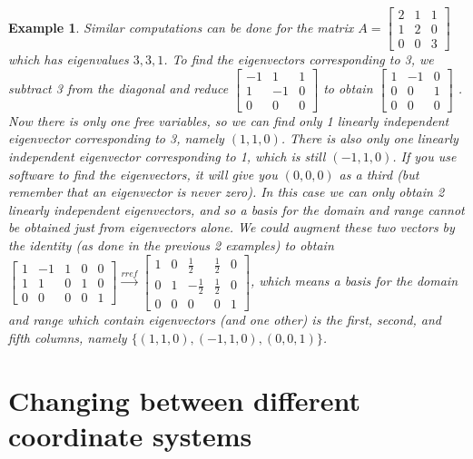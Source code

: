 \documentclass[10pt]{article}
\theoremstyle{plain}
\theoremstyle{box}
\newtheorem{example}{Example}
\begin{document}
\begin{example}
Similar computations can be done for the matrix
$A=
\begin{bmatrix}
 2 & 1 & 1 \\
 1 & 2 & 0 \\
 0 & 0 & 3
\end{bmatrix}
$ which has eigenvalues $3,3,1$. To find the eigenvectors corresponding to 3, we subtract 3 from the diagonal and reduce 
$
\begin{bmatrix}
 -1 & 1 & 1 \\
 1 & -1 & 0 \\
 0 & 0 & 0
\end{bmatrix}
$
to obtain
$
\begin{bmatrix}
 1 & -1 & 0 \\
 0 & 0 & 1\\
 0 & 0 & 0
\end{bmatrix}
$
. Now there is only one free variables, so we can find only 1 linearly independent eigenvector corresponding to 3, namely $(1,1,0)$. There is also only one linearly independent eigenvector corresponding to 1, which is still $(-1,1,0)$. If you use software to find the eigenvectors, it will give you $(0,0,0)$ as a third (but remember that an eigenvector is never zero). In this case we can only obtain 2 linearly independent eigenvectors, and so a basis for the domain and range cannot be obtained just from eigenvectors alone. We could augment these two vectors by the identity (as done in the previous 2 examples) to obtain 
$
\begin{bmatrix}
 1 & -1 & 1 & 0 & 0 \\
 1 & 1 & 0 & 1 & 0 \\
 0 & 0 & 0 & 0 & 1
\end{bmatrix}
\xrightarrow{rref}
\begin{bmatrix}
 1 & 0 & \frac{1}{2} & \frac{1}{2} & 0 \\
 0 & 1 & -\frac{1}{2} & \frac{1}{2} & 0 \\
 0 & 0 & 0 & 0 & 1
\end{bmatrix}
$, which means a basis for the domain and range which contain eigenvectors (and one other) is the first, second, and fifth columns, namely $\{ (1,1,0), (-1,1,0), (0,0,1) \}$.    

\end{example}


\section{Changing between different coordinate systems}
\end{document}
